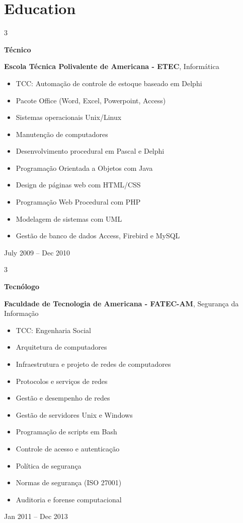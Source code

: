 \documentclass[10pt, letterpaper]{article}
\newenvironment{highlights}{
    \begin{itemize}[
        topsep=0.10 cm,
        parsep=0.10 cm,
        partopsep=0pt,
        itemsep=0pt,
        leftmargin=0.4 cm + 10pt
    ]
}{
    \end{itemize}
} %
\newenvironment{threecolentry}[3][]{
    \onecolentry
    \def\thirdColumn{#3}
    \setcolumnwidth{1 cm, \fill, 4.5 cm}
    \begin{paracol}{3}
    {\raggedright #2} \switchcolumn
}{
    \switchcolumn \raggedleft \thirdColumn
    \end{paracol}
    \endonecolentry
} %
\begin{document}
    \section{Education}



        
        \begin{threecolentry}{\textbf{Técnico}}{
            July 2009 – Dec 2010
        }
            \textbf{Escola Técnica Polivalente de Americana - ETEC}, Informática
            \begin{highlights}
                \item TCC: Automação de controle de estoque baseado em Delphi
                \item Pacote Office (Word, Excel, Powerpoint, Access)
                \item Sistemas operacionais Unix/Linux
                \item Manutenção de computadores
                \item Desenvolvimento procedural em Pascal e Delphi
                \item Programação Orientada a Objetos com Java
                \item Design de páginas web com HTML/CSS
                \item Programação Web Procedural com PHP
                \item Modelagem de sistemas com UML
                \item Gestão de banco de dados Access, Firebird e MySQL
            \end{highlights}
        \end{threecolentry}

        \vspace{0.2 cm}

        \begin{threecolentry}{\textbf{Tecnólogo}}{
            Jan 2011 – Dec 2013
        }
            \textbf{Faculdade de Tecnologia de Americana - FATEC-AM}, Segurança da Informação
            \begin{highlights}
                \item TCC: Engenharia Social
                \item Arquitetura de computadores
                \item Infraestrutura e projeto de redes de computadores
                \item Protocolos e serviços de redes
                \item Gestão e desempenho de redes
                \item Gestão de servidores Unix e Windows
                \item Programação de scripts em Bash
                \item Controle de acesso e autenticação
                \item Política de segurança
                \item Normas de segurança (ISO 27001)
                \item Auditoria e forense computacional
            \end{highlights}
        \end{threecolentry}
\end{document}
